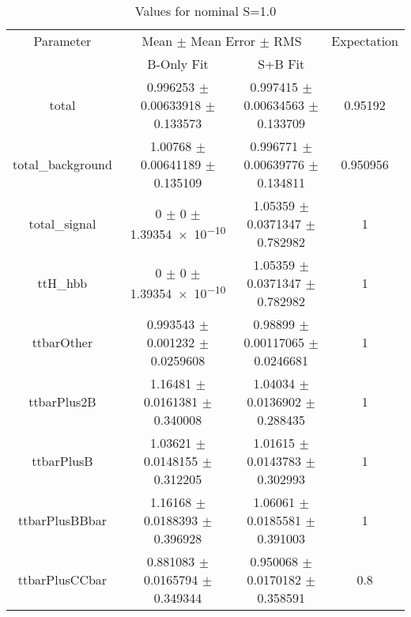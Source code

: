 \begin{table}
\centering
\caption{Values for nominal S=1.0}
\begin{tabular}{cccc}
\toprule
Parameter & \multicolumn{2}{c}{Mean $\pm$ Mean Error $\pm$ RMS} & Expectation\\
 & B-Only Fit & S+B Fit & \\
\midrule
total & \num{0.996253} $\pm$ \num{0.00633918} $\pm$ \num{0.133573} & \num{0.997415} $\pm$ \num{0.00634563} $\pm$ \num{0.133709} & \num{0.95192}\\
total\_background & \num{1.00768} $\pm$ \num{0.00641189} $\pm$ \num{0.135109} & \num{0.996771} $\pm$ \num{0.00639776} $\pm$ \num{0.134811} & \num{0.950956}\\
total\_signal & \num{0} $\pm$ \num{0} $\pm$ \num{1.39354e-10} & \num{1.05359} $\pm$ \num{0.0371347} $\pm$ \num{0.782982} & \num{1}\\
ttH\_hbb & \num{0} $\pm$ \num{0} $\pm$ \num{1.39354e-10} & \num{1.05359} $\pm$ \num{0.0371347} $\pm$ \num{0.782982} & \num{1}\\
ttbarOther & \num{0.993543} $\pm$ \num{0.001232} $\pm$ \num{0.0259608} & \num{0.98899} $\pm$ \num{0.00117065} $\pm$ \num{0.0246681} & \num{1}\\
ttbarPlus2B & \num{1.16481} $\pm$ \num{0.0161381} $\pm$ \num{0.340008} & \num{1.04034} $\pm$ \num{0.0136902} $\pm$ \num{0.288435} & \num{1}\\
ttbarPlusB & \num{1.03621} $\pm$ \num{0.0148155} $\pm$ \num{0.312205} & \num{1.01615} $\pm$ \num{0.0143783} $\pm$ \num{0.302993} & \num{1}\\
ttbarPlusBBbar & \num{1.16168} $\pm$ \num{0.0188393} $\pm$ \num{0.396928} & \num{1.06061} $\pm$ \num{0.0185581} $\pm$ \num{0.391003} & \num{1}\\
ttbarPlusCCbar & \num{0.881083} $\pm$ \num{0.0165794} $\pm$ \num{0.349344} & \num{0.950068} $\pm$ \num{0.0170182} $\pm$ \num{0.358591} & \num{0.8}\\
\bottomrule
\end{tabular}
\end{table}